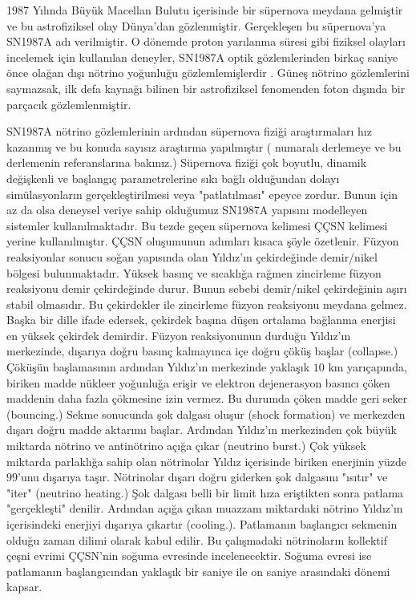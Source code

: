 1987 Yılında Büyük Macellan Bulutu içerisinde bir süpernova meydana gelmiştir ve bu astrofiziksel olay Dünya'dan gözlenmiştir. Gerçekleşen bu süpernova'ya SN1987A adı verilmiştir. O dönemde proton yarılanma süresi gibi fiziksel olayları incelemek için kullanılan deneyler, SN1987A optik gözlemlerinden birkaç saniye önce olağan dışı nötrino yoğunluğu gözlemlemişlerdir \cite{1987Natur.330..142S, 1987PhRvL..58.1490H}. Güneş nötrino gözlemlerini saymazsak, ilk defa kaynağı bilinen bir astrofiziksel fenomenden foton dışında bir parçacık gözlemlenmiştir.

SN1987A nötrino gözlemlerinin ardından süpernova fiziği araştırmaları hız kazanmış ve bu konuda sayısız araştırma yapılmıştır (\cite{Janka:2006fh} numaralı derlemeye ve bu derlemenin referanslarına bakınız.) Süpernova fiziği çok boyutlu, dinamik değişkenli ve başlangıç parametrelerine sıkı bağlı olduğundan dolayı simülasyonların gerçekleştirilmesi veya "patlatılması" epeyce zordur. Bunun için az da olsa deneysel veriye sahip olduğumuz SN1987A yapısını modelleyen sistemler kullanılmaktadır. Bu tezde geçen süpernova kelimesi ÇÇSN kelimesi yerine kullanılmıştır. ÇÇSN oluşumunun adımları kısaca şöyle özetlenir. Füzyon reaksiyonlar sonucu soğan yapısında olan Yıldız'ın çekirdeğinde demir/nikel bölgesi bulunmaktadır. Yüksek basınç ve sıcaklığa rağmen zincirleme füzyon reaksiyonu demir çekirdeğinde durur. Bunun sebebi demir/nikel çekirdeğinin aşırı stabil olmasıdır. Bu çekirdekler ile zincirleme füzyon reaksiyonu meydana gelmez. Başka bir dille ifade edersek, çekirdek başına düşen ortalama bağlanma enerjisi en yüksek çekirdek demirdir. Füzyon reaksiyonunun durduğu Yıldız'ın merkezinde, dışarıya doğru basınç kalmayınca içe doğru çöküş başlar (collapse.) Çöküşün başlamasının ardından Yıldız'ın merkezinde yaklaşık $ 10 $ km yarıçapında, biriken madde nükleer yoğunluğa erişir ve elektron dejenerasyon basıncı çöken maddenin daha fazla çökmesine izin vermez. Bu durumda çöken madde geri seker (bouncing.) Sekme sonucunda şok dalgası oluşur (shock formation) ve merkezden dışarı doğru madde aktarımı başlar. Ardından Yıldız'ın merkezinden çok büyük miktarda nötrino ve antinötrino açığa çıkar (neutrino burst.) Çok yüksek miktarda parlaklığa sahip olan nötrinolar Yıldız içerisinde biriken enerjinin yüzde $ 99 $'unu dışarıya taşır. Nötrinolar dışarı doğru giderken şok dalgasını "ısıtır" ve "iter" (neutrino heating.) Şok dalgası belli bir limit hıza eriştikten sonra patlama "gerçekleşti" denilir. Ardından açığa çıkan muazzam miktardaki nötrino Yıldız'ın içerisindeki enerjiyi dışarıya çıkartır (cooling.). Patlamanın başlangıcı sekmenin olduğu zaman dilimi olarak kabul edilir. Bu çalışmadaki nötrinoların kollektif çeşni evrimi ÇÇSN'nin soğuma evresinde incelenecektir. Soğuma evresi ise patlamanın başlangıcından yaklaşık bir saniye ile on saniye arasındaki dönemi kapsar. 


